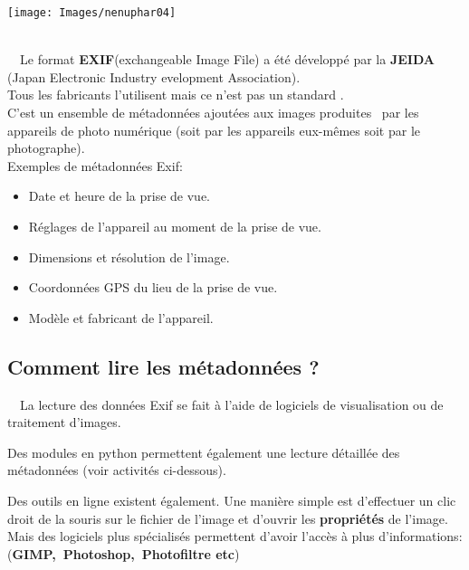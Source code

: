 \documentclass[10pt,fleqn]{article} %
\begin{document}
\begin{center}
	\texttt{[image: Images/nenuphar04]}
\end{center}\begin{tcolorbox}[width=17cm,enhanced,colback=lightgray!5!white,colframe=red,title=Pour démarrer,
	attach boxed title to top left=
	{yshift=-\tcboxedtitleheight/2},
	boxed title style={size=small,colback=black}]
	~~\\
	\RIGHTarrow ~~Le format \textbf{EXIF}(exchangeable Image File) a été développé par la \textbf{JEIDA} (Japan Electronic Industry evelopment Association).\\Tous les fabricants l'utilisent mais ce n'est pas un standard .\\
	C'est un ensemble de métadonnées ajoutées aux images produites~\cite{Tache} par les appareils de photo numérique (soit par les appareils eux-mêmes soit par le photographe).\\
	\vspace{0.4cm}
	Exemples de métadonnées Exif:
	\begin{itemize}
		\item Date et heure de la prise de vue.
		\item Réglages de l'appareil au moment de la prise de vue.
		\item Dimensions et résolution de l'image.
		\item Coordonnées GPS du lieu de la prise de vue.
		\item Modèle et fabricant de l'appareil.
	\end{itemize}
	
\end{tcolorbox}


\subsection{Comment lire les métadonnées ?}


\RIGHTarrow ~~La lecture des données Exif se fait à l'aide de logiciels de visualisation ou de traitement d'images.
\medskip

Des modules en python permettent également une lecture détaillée des métadonnées (voir activités ci-dessous).

\medskip

Des outils en ligne existent également.
Une manière simple est d'effectuer un clic droit de la souris sur le fichier de l'image et d'ouvrir les \textbf{propriétés} de l'image.\\
Mais des logiciels plus spécialisés permettent d'avoir l'accès à plus d'informations:\\ (\textbf{GIMP,~Photoshop,~Photofiltre etc})
\\
\end{document}
